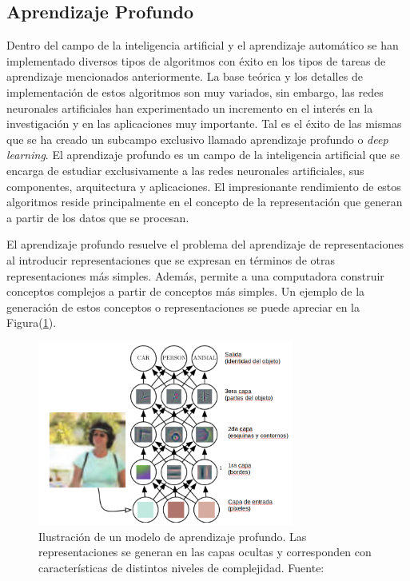     \subsection{Aprendizaje Profundo}
    Dentro del campo de la inteligencia artificial y el aprendizaje automático se han implementado diversos tipos 
    de algoritmos con éxito en los tipos de tareas de aprendizaje mencionados anteriormente. La base teórica y los detalles 
    de implementación de estos algoritmos son muy variados, sin embargo, las redes neuronales artificiales han experimentado 
    un incremento en el interés en la investigación y en las aplicaciones muy importante. Tal es el éxito de las mismas 
    que se ha creado un subcampo exclusivo llamado aprendizaje profundo o \textit{deep learning}. El aprendizaje profundo 
    es un campo de la inteligencia artificial que se encarga de estudiar exclusivamente a las redes neuronales artificiales, 
    sus componentes, arquitectura y aplicaciones. El impresionante rendimiento de estos algoritmos reside principalmente en el 
    concepto de la representación que generan a partir de los datos que se procesan. 

    El aprendizaje profundo resuelve el problema del aprendizaje de representaciones al introducir representaciones que se 
    expresan en términos de otras representaciones más simples. Además, permite a una computadora construir conceptos complejos 
    a partir de conceptos más simples. Un ejemplo de la generación de estos conceptos o representaciones se puede apreciar en la 
    Figura(\ref{fig:representacion}).
    
    
    \begin{figure}[!h] 
        \centering
        \includegraphics[width=0.75\textwidth]{img/representacion}
        \caption[Ilustración de un modelo de aprendizaje profundo]{Ilustración de un modelo de aprendizaje profundo. Las representaciones se generan en las capas ocultas y corresponden con características de distintos niveles de complejidad. Fuente: \cite{Goodfellow-et-al-2016} }
        \label{fig:representacion}
    \end{figure}

